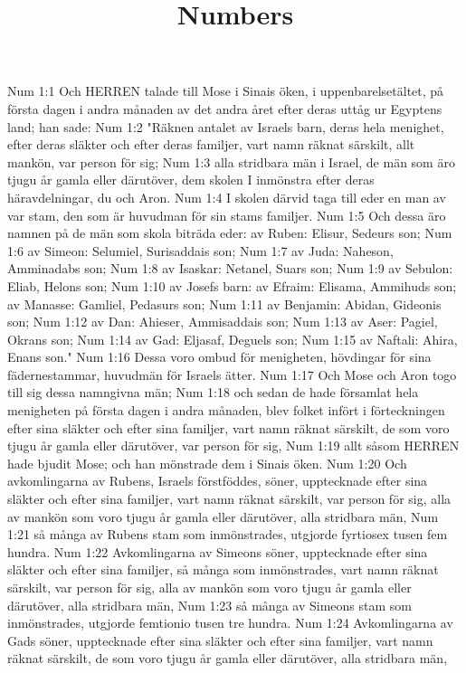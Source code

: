 

\title{Numbers}

Num 1:1  Och HERREN talade till Mose i Sinais öken, i uppenbarelsetältet, på första dagen i andra månaden av det andra året efter deras uttåg ur Egyptens land; han sade:
Num 1:2  "Räknen antalet av Israels barn, deras hela menighet, efter deras släkter och efter deras familjer, vart namn räknat särskilt, allt mankön, var person för sig;
Num 1:3  alla stridbara män i Israel, de män som äro tjugu år gamla eller därutöver, dem skolen I inmönstra efter deras häravdelningar, du och Aron.
Num 1:4  I skolen därvid taga till eder en man av var stam, den som är huvudman för sin stams familjer.
Num 1:5  Och dessa äro namnen på de män som skola biträda eder: av Ruben: Elisur, Sedeurs son;
Num 1:6  av Simeon: Selumiel, Surisaddais son;
Num 1:7  av Juda: Naheson, Amminadabs son;
Num 1:8  av Isaskar: Netanel, Suars son;
Num 1:9  av Sebulon: Eliab, Helons son;
Num 1:10  av Josefs barn: av Efraim: Elisama, Ammihuds son; av Manasse: Gamliel, Pedasurs son;
Num 1:11  av Benjamin: Abidan, Gideonis son;
Num 1:12  av Dan: Ahieser, Ammisaddais son;
Num 1:13  av Aser: Pagiel, Okrans son;
Num 1:14  av Gad: Eljasaf, Deguels son;
Num 1:15  av Naftali: Ahira, Enans son."
Num 1:16  Dessa voro ombud för menigheten, hövdingar för sina fädernestammar, huvudmän för Israels ätter.
Num 1:17  Och Mose och Aron togo till sig dessa namngivna män;
Num 1:18  och sedan de hade församlat hela menigheten på första dagen i andra månaden, blev folket infört i förteckningen efter sina släkter och efter sina familjer, vart namn räknat särskilt, de som voro tjugu år gamla eller därutöver, var person för sig,
Num 1:19  allt såsom HERREN hade bjudit Mose; och han mönstrade dem i Sinais öken.
Num 1:20  Och avkomlingarna av Rubens, Israels förstföddes, söner, upptecknade efter sina släkter och efter sina familjer, vart namn räknat särskilt, var person för sig, alla av mankön som voro tjugu år gamla eller därutöver, alla stridbara män,
Num 1:21  så många av Rubens stam som inmönstrades, utgjorde fyrtiosex tusen fem hundra.
Num 1:22  Avkomlingarna av Simeons söner, upptecknade efter sina släkter och efter sina familjer, så många som inmönstrades, vart namn räknat särskilt, var person för sig, alla av mankön som voro tjugu år gamla eller därutöver, alla stridbara män,
Num 1:23  så många av Simeons stam som inmönstrades, utgjorde femtionio tusen tre hundra.
Num 1:24  Avkomlingarna av Gads söner, upptecknade efter sina släkter och efter sina familjer, vart namn räknat särskilt, de som voro tjugu år gamla eller därutöver, alla stridbara män,

